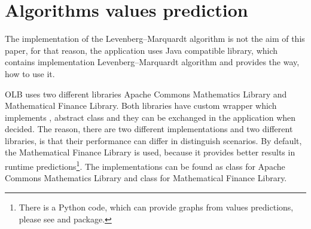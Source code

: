 \section{Algorithms values prediction}\label{sec:impl-algorithms-values-predictions}
The implementation of the Levenberg–Marquardt algorithm is not the aim of this paper,
for that reason, the application uses Java compatible library, 
which contains implementation Levenberg–Marquardt algorithm 
and provides the way, 
how to use it.

OLB uses two different libraries Apache Commons Mathematics Library\cite{web:apacheCommonsMath}
and Mathematical Finance Library\cite{web:finmathLib}.
Both libraries have custom wrapper which implements , abstract class 
and they can be exchanged in the application when decided.
The reason, there are two different implementations and two different libraries,
is that their performance can differ in distinguish scenarios.
By default, the Mathematical Finance Library is used, 
because it provides better results in runtime predictions\footnote{
    There is a Python code, 
    which can provide graphs from values predictions, 
    please see  
    and  package.
}.
The implementations can be found as  class for Apache Commons Mathematics Library
and  class for Mathematical Finance Library.